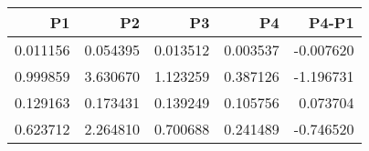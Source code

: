 \begin{tabular}{rrrrr}
\toprule
P1 & P2 & P3 & P4 & P4-P1 \\
\midrule
0.011156 & 0.054395 & 0.013512 & 0.003537 & -0.007620 \\
0.999859 & 3.630670 & 1.123259 & 0.387126 & -1.196731 \\
0.129163 & 0.173431 & 0.139249 & 0.105756 & 0.073704 \\
0.623712 & 2.264810 & 0.700688 & 0.241489 & -0.746520 \\
\bottomrule
\end{tabular}
